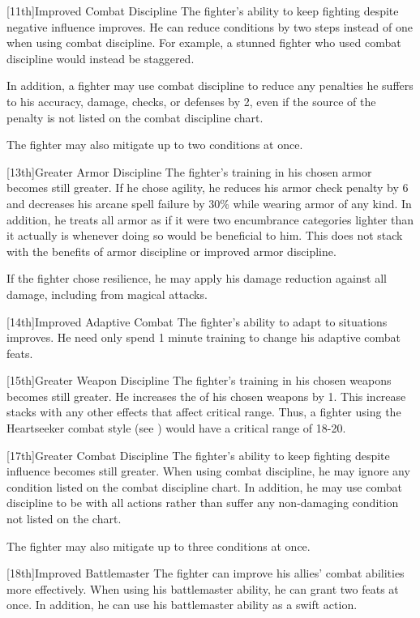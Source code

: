 [11th]{Improved Combat Discipline}
The fighter's ability to keep fighting despite negative influence improves.
He can reduce conditions by two steps instead of one when using combat discipline.
For example, a stunned fighter who used combat discipline would instead be staggered.
\par In addition, a fighter may use combat discipline to reduce any penalties he suffers to his accuracy, damage, checks, or defenses by 2, even if the source of the penalty is not listed on the combat discipline chart.
\par The fighter may also mitigate up to two conditions at once.

[13th]{Greater Armor Discipline}
The fighter's training in his chosen armor becomes still greater.
If he chose agility, he reduces his armor check penalty by 6 and decreases his arcane spell failure by 30\% while wearing armor of any kind.
In addition, he treats all armor as if it were two encumbrance categories lighter than it actually is whenever doing so would be beneficial to him.
This does not stack with the benefits of armor discipline or improved armor discipline.

If the fighter chose resilience, he may apply his damage reduction against all damage, including from magical attacks.

[14th]{Improved Adaptive Combat}
The fighter's ability to adapt to situations improves.
He need only spend 1 minute training to change his adaptive combat feats.

[15th]{Greater Weapon Discipline}
The fighter's training in his chosen weapons becomes still greater.
He increases the  of his chosen weapons by 1.
This increase stacks with any other effects that affect critical range.
Thus, a fighter using the Heartseeker combat style (see ) would have a critical range of 18-20.

[17th]{Greater Combat Discipline}
The fighter's ability to keep fighting despite influence becomes still greater.
When using combat discipline, he may ignore any condition listed on the combat discipline chart.
In addition, he may use combat discipline to be \severelyimpaired with all actions rather than suffer any non-damaging condition not listed on the chart.

\par The fighter may also mitigate up to three conditions at once.

[18th]{Improved Battlemaster}
The fighter can improve his allies' combat abilities more effectively.
When using his battlemaster ability, he can grant two feats at once.
In addition, he can use his battlemaster ability as a swift action.

